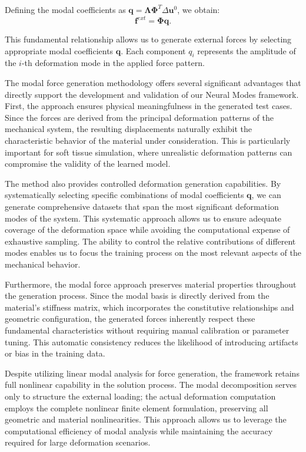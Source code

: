 Defining the modal coefficients as $\bm{q} = \boldsymbol{\Lambda} \boldsymbol{\Phi}^T \Delta\bm{u}^0$, we obtain:
\begin{equation}
    \bm{f}^{ext} = \boldsymbol{\Phi} \bm{q}.
\end{equation}

This fundamental relationship allows us to generate external forces by selecting appropriate modal coefficients $\bm{q}$. Each component $q_i$ represents the amplitude of the $i$-th deformation mode in the applied force pattern.


The modal force generation methodology offers several significant advantages that directly support the development and validation of our Neural Modes framework. First, the approach ensures physical meaningfulness in the generated test cases. Since the forces are derived from the principal deformation patterns of the mechanical system, the resulting displacements naturally exhibit the characteristic behavior of the material under consideration. This is particularly important for soft tissue simulation, where unrealistic deformation patterns can compromise the validity of the learned model.

The method also provides controlled deformation generation capabilities. By systematically selecting specific combinations of modal coefficients $\bm{q}$, we can generate comprehensive datasets that span the most significant deformation modes of the system. This systematic approach allows us to ensure adequate coverage of the deformation space while avoiding the computational expense of exhaustive sampling. The ability to control the relative contributions of different modes enables us to focus the training process on the most relevant aspects of the mechanical behavior.

Furthermore, the modal force approach preserves material properties throughout the generation process. Since the modal basis is directly derived from the material's stiffness matrix, which incorporates the constitutive relationships and geometric configuration, the generated forces inherently respect these fundamental characteristics without requiring manual calibration or parameter tuning. This automatic consistency reduces the likelihood of introducing artifacts or bias in the training data.

Despite utilizing linear modal analysis for force generation, the framework retains full nonlinear capability in the solution process. The modal decomposition serves only to structure the external loading; the actual deformation computation employs the complete nonlinear finite element formulation, preserving all geometric and material nonlinearities. This approach allows us to leverage the computational efficiency of modal analysis while maintaining the accuracy required for large deformation scenarios.


